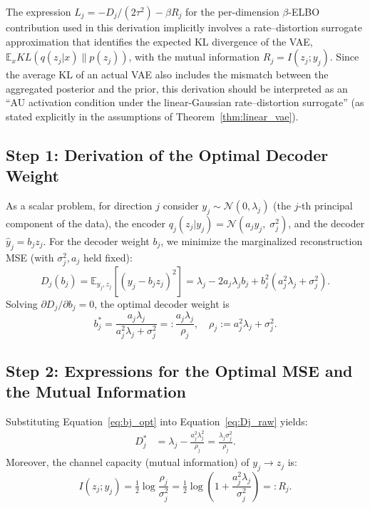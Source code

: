 \documentclass[make,article,submit,pdftex,moreauthors]{Definitions/mdpi}
\begin{document}
\begin{Remark}
The expression $L_j = -D_j/(2\tau^2) - \beta R_j$ for the per-dimension
$\beta$-ELBO contribution used in this derivation implicitly involves a
rate--distortion surrogate approximation that identifies the expected KL
divergence of the VAE, $\mathbb{E}_x KL(q(z_j|x)\|p(z_j))$, with the mutual
information $R_j = I(z_j; y_j)$.
Since the average KL of an actual VAE also includes the mismatch between the
aggregated posterior and the prior, this derivation should be interpreted as
an ``AU activation condition under the linear-Gaussian rate--distortion
surrogate'' (as stated explicitly in the assumptions of
Theorem~\ref{thm:linear_vae}).
\end{Remark}

\subsection*{Step 1: Derivation of the Optimal Decoder Weight}

As a scalar problem, for direction $j$ consider
$y_j \sim \mathcal{N}(0, \lambda_j)$ (the $j$-th principal component of the data),
the encoder $q_j(z_j | y_j) = \mathcal{N}(a_j y_j,\; \sigma_j^2)$,
and the decoder $\hat{y}_j = b_j z_j$.
For the decoder weight $b_j$, we minimize the marginalized reconstruction MSE
(with $\sigma_j^2, a_j$ held fixed):
\begin{equation}
  D_j(b_j) = \mathbb{E}_{y_j, z_j}[(y_j - b_j z_j)^2]
  = \lambda_j - 2 a_j \lambda_j b_j + b_j^2 (a_j^2 \lambda_j + \sigma_j^2).
  \label{eq:Dj_raw}
\end{equation}
Solving $\partial D_j / \partial b_j = 0$, the optimal decoder weight is
\begin{equation}
  b_j^* = \frac{a_j \lambda_j}{a_j^2 \lambda_j + \sigma_j^2}
         =: \frac{a_j \lambda_j}{\rho_j},
  \quad \rho_j := a_j^2 \lambda_j + \sigma_j^2.
  \label{eq:bj_opt}
\end{equation}

\subsection*{Step 2: Expressions for the Optimal MSE and the Mutual Information}

Substituting Equation~\eqref{eq:bj_opt} into Equation~\eqref{eq:Dj_raw} yields:
\begin{align}
  D_j^* &= \lambda_j - \frac{a_j^2 \lambda_j^2}{\rho_j}
          = \frac{\lambda_j \sigma_j^2}{\rho_j}.
  \label{eq:Dj_opt}
\end{align}
Moreover, the channel capacity (mutual information) of $y_j \to z_j$ is:
\begin{equation}
  I(z_j; y_j) = \tfrac{1}{2}\log\frac{\rho_j}{\sigma_j^2}
              = \tfrac{1}{2}\log\!\left(1 + \frac{a_j^2 \lambda_j}{\sigma_j^2}\right)
              =: R_j.
  \label{eq:Rj}
\end{equation}
\end{document}
